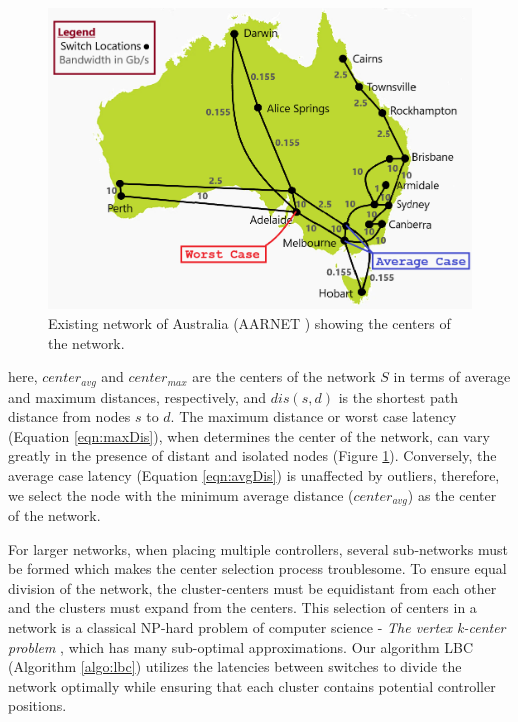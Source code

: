\documentclass[preprint,12pt]{elsarticle}
\begin{document}
	\begin{figure}
		\centering
		\includegraphics[width=0.85\linewidth]{Images/Aarnet.png}
		\caption{Existing network of Australia (AARNET \cite{knight2011internet}) showing the centers of the network.}
		\label{fig:aarnetcc}
	\end{figure}
	
	here, $center_{avg}$ and $center_{max}$ are the centers of the network $S$ in terms of average and maximum distances, respectively, and $dis(s,d)$ is the shortest path distance from nodes $s$ to $d$. The maximum distance or worst case latency (Equation \ref{eqn:maxDis}), when determines the center of the network, can vary greatly in the presence of distant and isolated nodes (Figure \ref{fig:aarnetcc}). Conversely, the average case latency (Equation \ref{eqn:avgDis}) is unaffected by outliers, therefore, we select the node with the minimum average distance ($center_{avg}$) as the center of the network.
	
	For larger networks, when placing multiple controllers, several sub-networks must be formed which makes the center selection process troublesome. To ensure equal division of the network, the cluster-centers must be equidistant from each other and the clusters must expand from the centers. This selection of centers in a network is a classical NP-hard problem of computer science - \textit{The vertex k-center problem} \cite{kariv1979algorithmic}, which has many sub-optimal approximations. Our algorithm LBC (Algorithm \ref{algo:lbc}) utilizes the latencies between switches to divide the network optimally while ensuring that each cluster contains potential controller positions.
	
\end{document}
